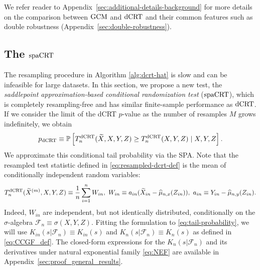 \documentclass[12pt]{article}
\theoremstyle{definition}
\def\P{\mathbb{P}}
\def\P{\mathbb{P}}
\renewcommand{\P}{\mathbb{P}}							%
\newcommand{\srx}{X}									%
\newcommand{\srz}{Z}									%
\newcommand{\srxk}{\widetilde X}						%
\newcommand{\sry}{Y}									%
\newcommand{\dCRT}{\textnormal{dCRT}} 					%
\newcommand{\GCM}{\textnormal{GCM}}						%
\newcommand{\spacrt}{\textnormal{spaCRT}}               %
\begin{document}
  We refer reader to Appendix~\ref{sec:additional-details-background} for more details on the comparison between $\GCM$ and $\dCRT$ and their common features such as double robustness (Appendix~\ref{sec:double-robustness}).
  
  \subsection{The $\spacrt$}
  
  The resampling procedure in Algorithm \ref{alg:dcrt-hat} is slow and can be infeasible for large datasets. In this section, we propose a new test, the \textit{saddlepoint approximation-based conditional randomization test} ($\spacrt$), which is completely resampling-free and has similar finite-sample performance as $\dCRT$. If we consider the limit of the dCRT $p$-value as the number of resamples $M$ grows indefinitely, we obtain
  \begin{align}\label{eq:dCRT-p-value-limit}
  p_{\dCRT} \equiv \P\left[T_n^{\dCRT}(\widetilde{X},X,Y,Z)\geq T_n^{\dCRT}(X,Y,Z) \mid X,Y,Z\right].
  \end{align}
  We approximate this conditional tail probability via the SPA. Note that the resampled test statistic defined in \eqref{eq:resampled-dcrt-def} is the mean of  conditionally independent random variables:
  \begin{align*}
	T_n^{\dCRT}(\srxk^{(m)}, \srx, \sry, \srz) \equiv \frac{1}{n}\sum_{i=1}^n W_{in},\ W_{in}\equiv a_{in}(\widetilde X_{in}-\widehat{\mu}_{n,x}(Z_{in})),\ a_{in}\equiv Y_{in}-\widehat\mu_{n,y}(Z_{in}).
  \end{align*}
  Indeed, $W_{in}$ are independent, but not identically distributed, conditionally on the $\sigma$-algebra $\mathcal{F}_n \equiv \sigma(\srx,\sry,\srz)$. Fitting the formulation to \eqref{eq:tail-probability}, we will use $K_{in}(s|\mathcal{F}_n)\equiv K_{in}(s)$ and $K_{n}(s|\mathcal{F}_n)\equiv K_{n}(s)$ as defined in \eqref{eq:CCGF_def}. The closed-form expressions for the $K_n(s|\mathcal{F}_n)$ and its derivatives under natural exponential family \eqref{eq:NEF} are available in Appendix~\ref{sec:proof_general_results}.
  \small
\end{document}

